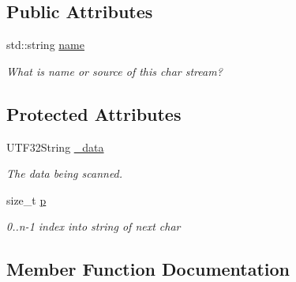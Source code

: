 \subsection*{Public Attributes}
\begin{DoxyCompactItemize}
\item 
\mbox{\label{classantlr4_1_1ANTLRInputStream_a484ecb90c871af2b7ccd364720caf4ee}} 
std\+::string \hyperlink{classantlr4_1_1ANTLRInputStream_a484ecb90c871af2b7ccd364720caf4ee}{name}
\begin{DoxyCompactList}\small\item\em What is name or source of this char stream? \end{DoxyCompactList}\end{DoxyCompactItemize}
\subsection*{Protected Attributes}
\begin{DoxyCompactItemize}
\item 
\mbox{\label{classantlr4_1_1ANTLRInputStream_ad5187c1a38d8118cb4814db0b8178a6b}} 
U\+T\+F32\+String \hyperlink{classantlr4_1_1ANTLRInputStream_ad5187c1a38d8118cb4814db0b8178a6b}{\+\_\+data}
\begin{DoxyCompactList}\small\item\em The data being scanned. \end{DoxyCompactList}\item 
size\+\_\+t \hyperlink{classantlr4_1_1ANTLRInputStream_a9499bf048c340771ad5f899a721c7f8d}{p}
\begin{DoxyCompactList}\small\item\em 0..n-\/1 index into string of next char \end{DoxyCompactList}\end{DoxyCompactItemize}


\subsection{Member Function Documentation}
\mbox{\label{classantlr4_1_1ANTLRInputStream_a4c9a7beab5662a33a537fa49fc27db9f}} 
